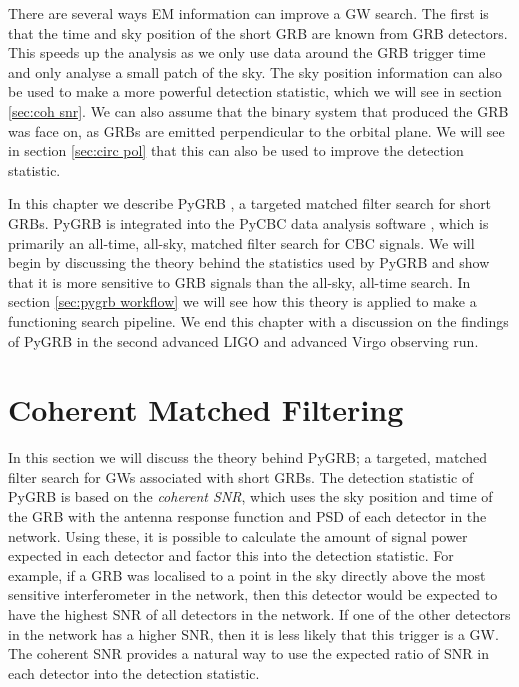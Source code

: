 \documentclass[11pt]{cuthesis}
\begin{document}
There are several ways EM information can improve a GW search. The first is that the time and sky position of the short GRB are known from GRB detectors. This speeds up the analysis as we only use data around the GRB trigger time and only analyse a small patch of the sky. The sky position information can also be used to make a more powerful detection statistic, which we will see in section \ref{sec:coh snr}. We can also assume that the binary system that produced the GRB was face on, as GRBs are emitted perpendicular to the orbital plane. We will see in section \ref{sec:circ pol} that this can also be used to improve the detection statistic.  

In this chapter we describe PyGRB \cite{pygrb_harry} \cite{pygrb_Williamson:2014}, a targeted matched filter search for short GRBs. PyGRB is integrated into the PyCBC data analysis software \cite{pycbc_Allen:2005} \cite{pycbc_Allen:2004} \cite{pycbc_Nitz:2017} \cite{pycbc_Canton:2014}, which is primarily an all-time, all-sky, matched filter search for CBC signals. We will begin by discussing the theory behind the statistics used by PyGRB and show that it is more sensitive to GRB signals than the all-sky, all-time search. In section \ref{sec:pygrb workflow} we will see how this theory is applied to make a functioning search pipeline. We end this chapter with a discussion on the findings of PyGRB in the second advanced LIGO and advanced Virgo observing run.


\section{Coherent Matched Filtering} \label{sec:PyGRB}
In this section we will discuss the theory behind PyGRB; a targeted, matched filter search for GWs associated with short GRBs. The detection statistic of PyGRB is based on the \textit{coherent SNR}, which uses the sky position and time of the GRB with the antenna response function and PSD of each detector in the network. Using these, it is possible to calculate the amount of signal power expected in each detector and factor this into the detection statistic. For example, if a GRB was localised to a point in the sky directly above the most sensitive interferometer in the network, then this detector would be expected to have the highest SNR of all detectors in the network. If one of the other detectors in the network has a higher SNR, then it is less likely that this trigger is a GW. The coherent SNR provides a natural way to use the expected ratio of SNR in each detector into the detection statistic.
\end{document}
